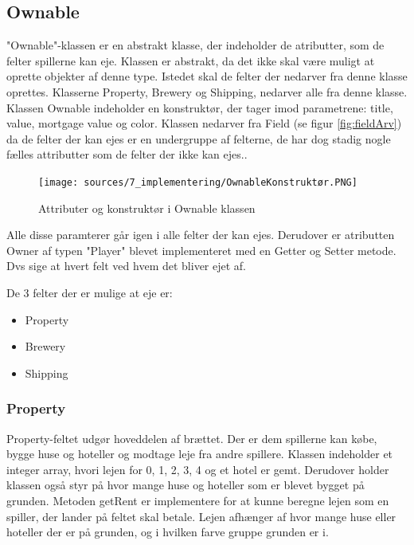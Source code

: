 \subsection{Ownable}
"Ownable"-klassen er en abstrakt klasse, der indeholder de atributter, som de felter spillerne kan eje. Klassen er abstrakt, da det ikke skal være muligt at oprette objekter af denne type. Istedet skal de felter der nedarver fra denne klasse oprettes. Klasserne Property, Brewery og Shipping, nedarver alle fra denne klasse. Klassen Ownable indeholder en konstruktør, der tager imod parametrene: title, value, mortgage value og color.
Klassen nedarver fra Field (se figur \ref{fig:fieldArv}) da de felter der kan ejes er en undergruppe af felterne, de har dog stadig nogle fælles attributter som de felter der ikke kan ejes..
\begin{figure}[H]
    \centering
    \texttt{[image: sources/7\_implementering/OwnableKonstruktør.PNG]}
    \caption{Attributer og konstruktør i Ownable klassen}
    \label{fig:OwnableKons}
\end{figure}
Alle disse paramterer går igen i alle felter der kan ejes. Derudover er atributten Owner af typen "Player" blevet implementeret med en Getter og Setter metode. Dvs sige at hvert felt ved hvem det bliver ejet af. 

\newpage
De 3 felter der er mulige at eje er:

\begin{itemize}
    \item Property
    \item Brewery
    \item Shipping
\end{itemize}

\subsubsection{Property}
Property-feltet udgør hoveddelen af brættet. Der er dem spillerne kan købe, bygge huse og hoteller og modtage leje fra andre spillere. Klassen indeholder et integer array, hvori lejen for 0, 1, 2, 3, 4 og et hotel er gemt. Derudover holder klassen også styr på hvor mange huse og hoteller som er blevet bygget på grunden. Metoden getRent er implementere for at kunne beregne lejen som en spiller, der lander på feltet skal betale. Lejen afhænger af hvor mange huse eller hoteller der er på grunden, og i hvilken farve gruppe grunden er i.

